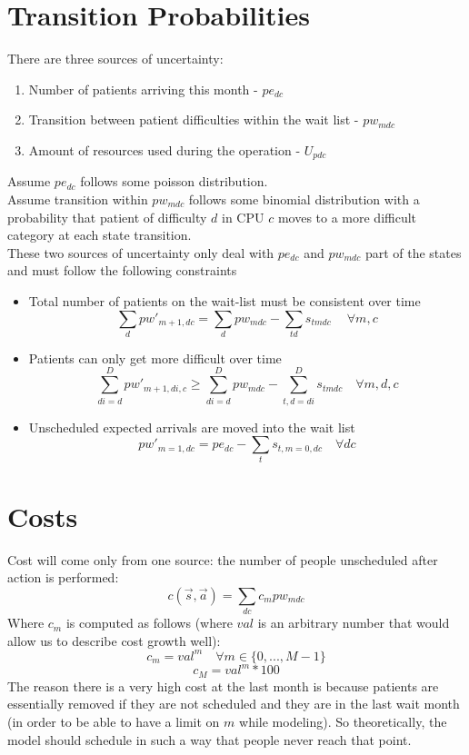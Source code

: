 \documentclass{article}
\begin{document}
\section{Transition Probabilities}
There are three sources of uncertainty: 
\begin{enumerate}
    \item Number of patients arriving this month - $pe_{dc}$
    \item Transition between patient difficulties within the wait list - $pw_{mdc}$
    \item Amount of resources used during the operation - $U_{pdc}$
\end{enumerate}

Assume $pe_{dc}$ follows some poisson distribution. \\
Assume transition within $pw_{mdc}$ follows some binomial distribution with a probability that patient of difficulty $d$ in CPU $c$ moves to a more difficult category at each state transition. \\
These two sources of uncertainty only deal with $pe_{dc}$ and $pw_{mdc}$ part of the states and must follow the following constraints
\begin{itemize}
	\item Total number of patients on the wait-list must be consistent over time
	\[ \sum_{d} pw'_{m+1,dc} = \sum_{d} pw_{mdc} - \sum_{td} s_{tmdc}\ \quad \forall m, c \]
	\item Patients can only get more difficult over time
	\[ \sum_{di = d}^{D} pw'_{m+1,di,c} \ge \sum_{di = d}^{D} pw_{mdc} - \sum_{t,d=di}^{D} s_{tmdc} \quad \forall m,d,c \]
	\item  Unscheduled expected arrivals are moved into the wait list
	\[ pw'_{m=1, dc} = pe_{dc} -\sum_{t} s_{t, m=0, dc} \quad \forall dc \]
\end{itemize}
    
\section{Costs}
Cost will come only from one source: the number of people unscheduled after action is performed:
\[ c(\vec{s}, \vec{a}) = \sum_{dc} c_m pw_{mdc} \]
Where $c_m$ is computed as follows (where $val$ is an arbitrary number that would allow us to describe cost growth well):
	\[ c_{m} = val^m \quad \forall m \in \{ 0, ..., M-1 \} \]
	\[ c_{M} = val^m * 100  \]
The reason there is a very high cost at the last month is because patients are essentially removed if they are not scheduled and they are in the last wait month (in order to be able to have a limit on $m$ while modeling). So theoretically, the model should schedule in such a way that people never reach that point.
\end{document}
